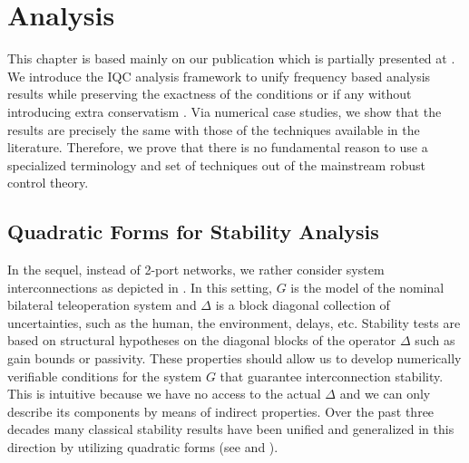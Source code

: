 \chapter{Analysis}
\label{chap:analysis}

This chapter is based mainly on our publication \cite{polattro} which is partially presented at 
\cite{polatACC11,polatIFAC11,polatWH11}. We introduce the IQC analysis framework to unify frequency 
based analysis results while preserving the exactness of the conditions or if any without introducing extra 
conservatism . Via numerical case studies, we show that the results are precisely the same with those of the 
techniques available in the literature. Therefore, we prove that there is no fundamental reason to use a 
specialized terminology and set of techniques out of the mainstream robust control theory.


\section{Quadratic Forms for Stability Analysis}
In the sequel, instead of 2-port networks, we rather consider system interconnections as 
depicted in . In this setting, $G$ is the model of the nominal bilateral 
teleoperation system and $\Delta$ is a block diagonal collection of uncertainties, such as 
the human, the environment, delays, etc. Stability tests are based on structural hypotheses 
on the diagonal blocks of the operator $\Delta$ such as gain bounds or passivity. These 
properties should allow us to develop numerically verifiable conditions for the system $G$ that 
guarantee interconnection stability. This is intuitive because we have no access to the actual 
$\Delta$ and we can only describe its components by means of indirect properties. Over the 
past three decades many classical stability results have been unified and generalized in 
this direction by utilizing quadratic forms (see \cite{megretski} and \cite{safonov,carsten2,iwasaki}).


